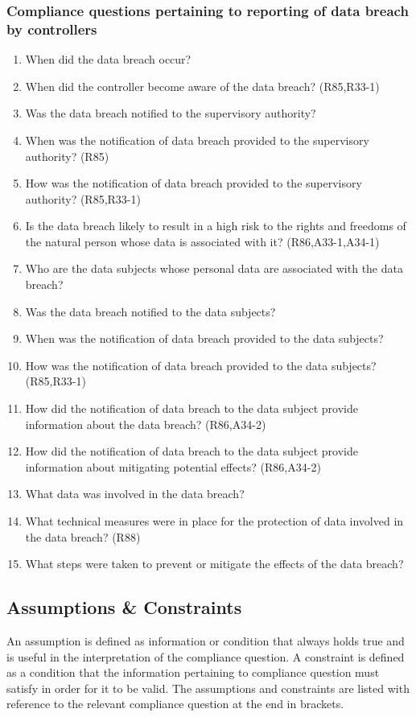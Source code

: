 \subsubsection{Compliance questions pertaining to reporting of data breach by controllers}
\begin{enumerate}[label={\textit{CMQ.\theenumi}},resume]
    \item When did the data breach occur?
    \item When did the controller become aware of the data breach? (R85,R33-1)
    \item Was the data breach notified to the supervisory authority?
    \item When was the notification of data breach provided to the supervisory authority? (R85)
    \item How was the notification of data breach provided to the supervisory authority? (R85,R33-1)
    \item Is the data breach likely to result in a high risk to the rights and freedoms of the natural person whose data is associated with it? (R86,A33-1,A34-1)
    \item Who are the data subjects whose personal data are associated with the data breach?
    \item Was the data breach notified to the data subjects?
    \item When was the notification of data breach provided to the data subjects?
    \item How was the notification of data breach provided to the data subjects? (R85,R33-1)
    \item How did the notification of data breach to the data subject provide information about the data breach? (R86,A34-2)
    \item How did the notification of data breach to the data subject provide information about mitigating potential effects? (R86,A34-2)
    \item What data was involved in the data breach?
    \item What technical measures were in place for the protection of data involved in the data breach? (R88)
    \item What steps were taken to prevent or mitigate the effects of the data breach?
\end{enumerate}

\subsection{Assumptions \& Constraints}\label{sec:info:constraints}
An assumption is defined as information or condition that always holds true and is useful in the interpretation of the compliance question. A constraint is defined as a condition that the information pertaining to compliance question must satisfy in order for it to be valid. The assumptions and constraints are listed with reference to the relevant compliance question at the end in brackets.

